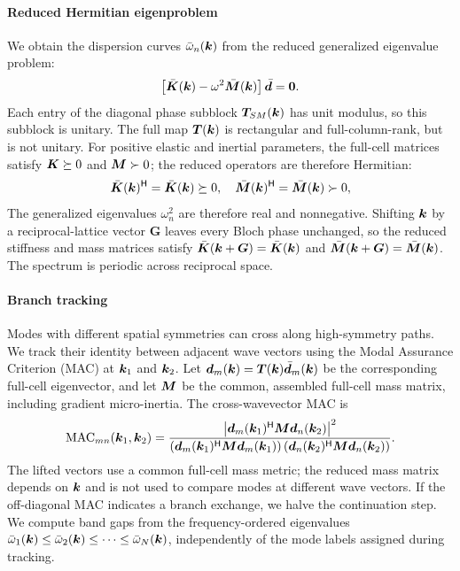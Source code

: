 \paragraph{Reduced Hermitian eigenproblem}
We obtain the dispersion curves $\bar{\omega}_n(\bm{k})$ from the reduced generalized eigenvalue problem:
\begin{equation}
\left[ \bar{\bm{K}}(\bm{k}) - \omega^2 \bar{\bm{M}}(\bm{k}) \right] \bar{\bm{d}} = \bm{0}.
\label{eq:eigenproblem}
\end{equation}
Each entry of the diagonal phase subblock $\bm{T}_{SM}(\bm{k})$ has unit modulus, so this subblock is unitary. The full map $\bm{T}(\bm{k})$ is rectangular and full-column-rank, but is not unitary. For positive elastic and inertial parameters, the full-cell matrices satisfy $\bm{K}\succeq 0$ and $\bm{M}\succ 0$; the reduced operators are therefore Hermitian:
\begin{equation}
\bar{\bm{K}}(\bm{k})^\mathsf{H} = \bar{\bm{K}}(\bm{k}) \succeq 0, \quad \bar{\bm{M}}(\bm{k})^\mathsf{H} = \bar{\bm{M}}(\bm{k}) \succ 0,
\label{eq:hermiticity}
\end{equation}
The generalized eigenvalues $\omega_n^2$ are therefore real and nonnegative. Shifting $\bm{k}$ by a reciprocal-lattice vector $\bm{G}$ leaves every Bloch phase unchanged, so the reduced stiffness and mass matrices satisfy $\bar{\bm{K}}(\bm{k} + \bm{G}) = \bar{\bm{K}}(\bm{k})$ and $\bar{\bm{M}}(\bm{k} + \bm{G}) = \bar{\bm{M}}(\bm{k})$. The spectrum is periodic across reciprocal space.

\paragraph{Branch tracking}
Modes with different spatial symmetries can cross along high-symmetry paths. We track their identity between adjacent wave vectors using the Modal Assurance Criterion (MAC) at $\bm{k}_1$ and $\bm{k}_2$. Let $\bm{d}_m(\bm{k})=\bm{T}(\bm{k})\bar{\bm{d}}_m(\bm{k})$ be the corresponding full-cell eigenvector, and let $\bm{M}$ be the common, assembled full-cell mass matrix, including gradient micro-inertia. The cross-wavevector MAC is
\begin{equation}
\mathrm{MAC}_{mn}(\bm{k}_1,\bm{k}_2) = \frac{\left| \bm{d}_m(\bm{k}_1)^\mathsf{H} \bm{M} \bm{d}_n(\bm{k}_2) \right|^2}{\left( \bm{d}_m(\bm{k}_1)^\mathsf{H} \bm{M} \bm{d}_m(\bm{k}_1) \right) \left( \bm{d}_n(\bm{k}_2)^\mathsf{H} \bm{M} \bm{d}_n(\bm{k}_2) \right)}.
\label{eq:mac_def}
\end{equation}
The lifted vectors use a common full-cell mass metric; the reduced mass matrix depends on $\bm{k}$ and is not used to compare modes at different wave vectors. If the off-diagonal MAC indicates a branch exchange, we halve the continuation step. We compute band gaps from the frequency-ordered eigenvalues $\bar{\omega}_1(\bm{k}) \le \bar{\omega}_2(\bm{k}) \le \dots \le \bar{\omega}_N(\bm{k})$, independently of the mode labels assigned during tracking.
